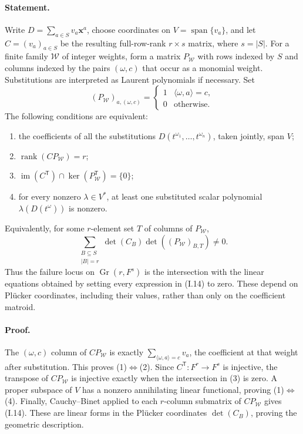 \documentclass[11pt,a4paper]{article}
\theoremstyle{definition}\newtheorem{definition}{Definition}
\begin{document}
\paragraph{Statement.}
Write $D=\sum_{a\in S}v_a\mathbf x^a$, choose coordinates on
$V=\operatorname{span}\{v_a\}$, and let $C=(v_a)_{a\in S}$ be the
resulting full-row-rank $r\times s$ matrix, where $s=|S|$.
For a finite family $\mathcal W$ of integer weights, form a matrix
$P_{\mathcal W}$ with rows indexed by $S$ and columns indexed by
the pairs $(\omega,c)$ that occur as a monomial weight.  Substitutions
are interpreted as Laurent polynomials if necessary.  Set
\[
 (P_{\mathcal W})_{a,(\omega,c)}
   =\begin{cases}1&\langle\omega,a\rangle=c,\\0&\text{otherwise.}\end{cases}
\]
The following conditions are equivalent:
\begin{enumerate}
\item the coefficients of all the substitutions
$D(t^{\omega_1},\ldots,t^{\omega_n})$, taken jointly, span $V$;
\item $\operatorname{rank}(CP_{\mathcal W})=r$;
\item $\operatorname{im}(C^{\mathsf T})\cap
\ker(P_{\mathcal W}^{\mathsf T})=\{0\}$;
\item for every nonzero $\lambda\in V^*$, at least one substituted
scalar polynomial $\lambda(D(t^\omega))$ is nonzero.
\end{enumerate}
Equivalently, for some $r$-element set $T$ of columns of $P_{\mathcal W}$,
\[
 \sum_{\substack{B\subseteq S\\|B|=r}}
   \det(C_B)\det((P_{\mathcal W})_{B,T})\ne0.
\tag{I.14}\label{eq:I-joint-Plucker}
\]
Thus the failure locus on $\operatorname{Gr}(r,F^s)$ is the
intersection with the linear equations obtained by setting every
expression in (I.14) to zero.  These depend on Pl\"ucker coordinates,
including their values, rather than only on the coefficient matroid.

\paragraph{Proof.}
The $(\omega,c)$ column of $CP_{\mathcal W}$ is exactly
$\sum_{\langle\omega,a\rangle=c}v_a$, the coefficient at that
weight after substitution.  This proves (1)$\Leftrightarrow$(2).
Since $C^{\mathsf T}:F^r\to F^s$ is injective, the transpose of
$CP_{\mathcal W}$ is injective exactly when the intersection in
(3) is zero.  A proper subspace of $V$ has a nonzero annihilating
linear functional, proving (1)$\Leftrightarrow$(4).  Finally,
Cauchy--Binet applied to each $r$-column submatrix of
$CP_{\mathcal W}$ gives (I.14).  These are linear forms in the
Pl\"ucker coordinates $\det(C_B)$, proving the geometric description.
\end{document}
